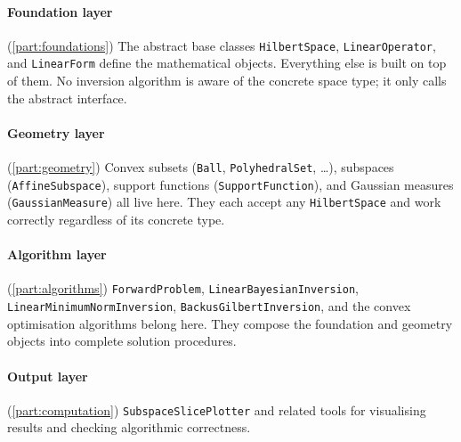 \documentclass[11pt,twoside,openright]{book}
\theoremstyle{plain}
\theoremstyle{definition}
\theoremstyle{remark}
\begin{document}
\medskip
\begin{center}
\end{center}
\medskip

\paragraph{Foundation layer}
(\cref{part:foundations}) The abstract base classes
\texttt{HilbertSpace}, \texttt{LinearOperator}, and \texttt{LinearForm}
define the mathematical objects.  Everything else is built on top of
them.  No inversion algorithm is aware of the concrete space type; it
only calls the abstract interface.

\paragraph{Geometry layer}
(\cref{part:geometry}) Convex subsets (\texttt{Ball},
\texttt{PolyhedralSet}, \ldots), subspaces (\texttt{AffineSubspace}),
support functions (\texttt{SupportFunction}), and Gaussian measures
(\texttt{GaussianMeasure}) all live here.  They each accept any
\texttt{HilbertSpace} and work correctly regardless of its concrete type.

\paragraph{Algorithm layer}
(\cref{part:algorithms}) \texttt{ForwardProblem},
\texttt{LinearBayesianInversion}, \texttt{LinearMinimumNormInversion},
\texttt{BackusGilbertInversion}, and the convex optimisation algorithms
belong here.  They compose the foundation and geometry objects into
complete solution procedures.

\paragraph{Output layer}
(\cref{part:computation}) \texttt{SubspaceSlicePlotter} and related
tools for visualising results and checking algorithmic correctness.
\end{document}
